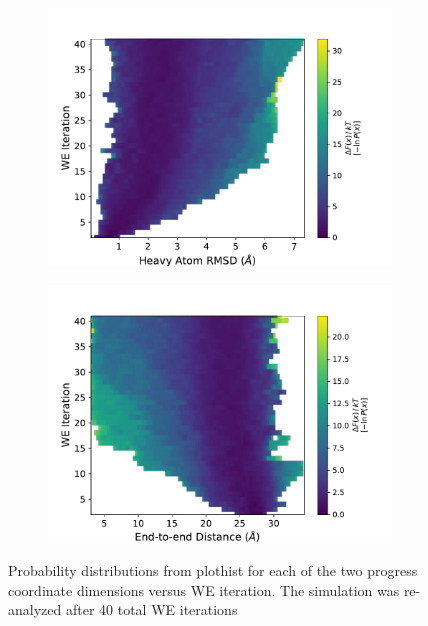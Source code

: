 \documentclass[9pt,tutorial,ASAPversion]{livecoms}
\begin{document}
\begin{figure}
\centering
\begin{subfigure}[A]{0.35\textwidth}
\includegraphics[width=\linewidth]{Figure7A.pdf}
\end{subfigure}
\begin{subfigure}[B]{0.35\textwidth}
\includegraphics[width=\linewidth]{Figure7B.pdf}
\end{subfigure}
\caption{Probability distributions from plothist for each of the two progress coordinate dimensions versus WE iteration. 
The simulation was re-analyzed after 40 total WE iterations}
\label{fig:view}
\end{figure}
\end{document}
